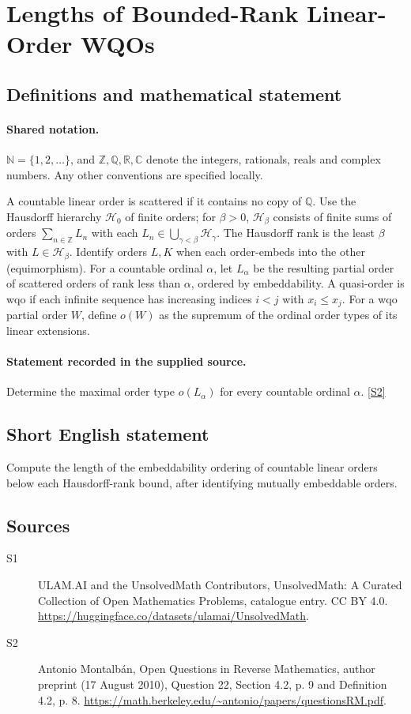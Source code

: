 \documentclass[11pt]{article}
\newcommand{\sref}[2]{\hyperlink{source:#1:#2}{[S#2]}}
\begin{document}
\section{Lengths of Bounded-Rank Linear-Order WQOs}\label{statement}

\subsection{Definitions and mathematical statement}

\paragraph{Shared notation.}$\mathbb N=\{1,2,\ldots\}$, and $\mathbb Z,\mathbb Q,\mathbb R,\mathbb C$ denote the integers, rationals, reals and complex numbers. Any other conventions are specified locally.


A countable linear order is scattered if it contains no copy of $\mathbb Q$. Use the Hausdorff hierarchy $\mathcal H_0$ of finite orders; for $\beta>0$, $\mathcal H_\beta$ consists of finite sums of orders $\sum_{n\in\mathbb Z}L_n$ with each $L_n\in\bigcup_{\gamma<\beta}\mathcal H_\gamma$. The Hausdorff rank is the least $\beta$ with $L\in\mathcal H_\beta$. Identify orders $L,K$ when each order-embeds into the other (equimorphism). For a countable ordinal $\alpha$, let $L_\alpha$ be the resulting partial order of scattered orders of rank less than $\alpha$, ordered by embeddability. A quasi-order is wqo if each infinite sequence has increasing indices $i<j$ with $x_i\le x_j$. For a wqo partial order $W$, define $o(W)$ as the supremum of the ordinal order types of its linear extensions.
\paragraph{Statement recorded in the supplied source.}
Determine the maximal order type $o(L_\alpha)$ for every countable ordinal $\alpha$. \sref{statement}{2}
\subsection{Short English statement}
Compute the length of the embeddability ordering of countable linear orders below each Hausdorff-rank bound, after identifying mutually embeddable orders.
\subsection{Sources}
\begin{description}
\item[\hypertarget{source:statement:1}{S1}] ULAM.AI and the UnsolvedMath Contributors, UnsolvedMath: A Curated Collection of Open Mathematics Problems, catalogue entry. CC BY 4.0. \url{https://huggingface.co/datasets/ulamai/UnsolvedMath}.
\item[\hypertarget{source:statement:2}{S2}] Antonio Montalbán, Open Questions in Reverse Mathematics, author preprint (17 August 2010), Question 22, Section 4.2, p. 9 and Definition 4.2, p. 8. \url{https://math.berkeley.edu/~antonio/papers/questionsRM.pdf}.
\end{description}
\label{end:statement}
\end{document}
